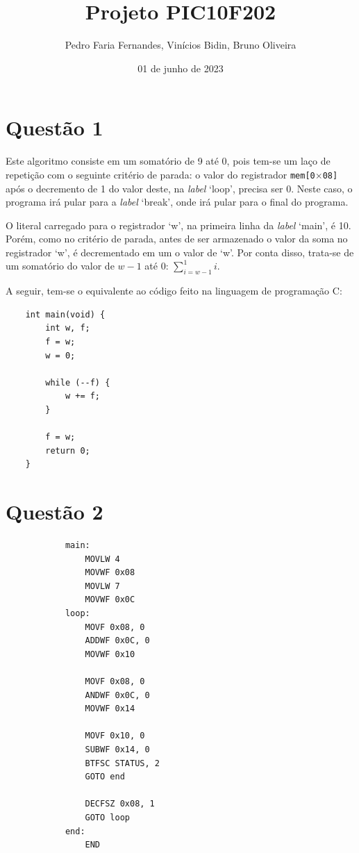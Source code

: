 \documentclass[12pt]{report}
\title{Projeto PIC10F202}
\author{Pedro Faria Fernandes, Vinícios Bidin, Bruno Oliveira}
\date{01 de junho de 2023}
\begin{document}
	\maketitle
	\section*{Questão 1}
		Este algoritmo consiste em um somatório de 9 até 0, pois tem-se um laço de repetição com o seguinte critério de parada: o valor do registrador \texttt{mem[0$\times$08]}
		após o decremento de 1 do valor deste, na \textit{label} `loop', precisa ser 0. Neste caso, o programa irá pular para a \textit{label} `break', onde irá pular para o final do programa.

		O literal carregado para o registrador `w', na primeira linha da \textit{label} `main', é 10. Porém, como no critério de parada, antes de ser armazenado o valor da soma no registrador `w', é decrementado em um o valor de `w'. Por conta disso, trata-se de um somatório do valor de $w - 1$ até 0: $\sum\limits_{i=w-1}^{1}i$.

		A seguir, tem-se o equivalente ao código feito na linguagem de programação C:\@
	\begin{verbatim}
	int main(void) {
		int w, f;
		f = w;
		w = 0;

		while (--f) {
			w += f;
		}

		f = w;
		return 0;
	}
	\end{verbatim}
	\clearpage
	\section*{Questão 2}
		\begin{verbatim}
			main:
			    MOVLW 4
			    MOVWF 0x08
			    MOVLW 7
			    MOVWF 0x0C
			loop:
			    MOVF 0x08, 0
			    ADDWF 0x0C, 0
			    MOVWF 0x10

			    MOVF 0x08, 0
			    ANDWF 0x0C, 0
			    MOVWF 0x14

			    MOVF 0x10, 0
			    SUBWF 0x14, 0
			    BTFSC STATUS, 2
			    GOTO end

			    DECFSZ 0x08, 1
			    GOTO loop
			end:
			    END
		\end{verbatim}
\end{document}
